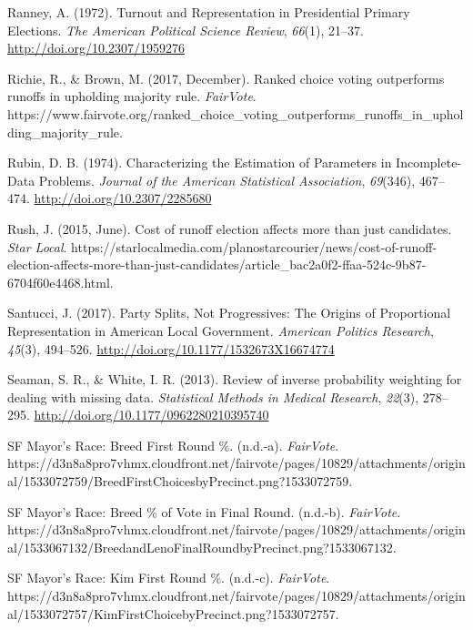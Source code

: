 \documentclass[12pt,twoside]{reedthesis}
\begin{document}
\leavevmode\hypertarget{ref-ranney_turnout_1972}{}%
Ranney, A. (1972). Turnout and Representation in Presidential Primary Elections. \emph{The American Political Science Review}, \emph{66}(1), 21--37. \url{http://doi.org/10.2307/1959276}

\leavevmode\hypertarget{ref-richie_ranked_2017}{}%
Richie, R., \& Brown, M. (2017, December). Ranked choice voting outperforms runoffs in upholding majority rule. \emph{FairVote}. https://www.fairvote.org/ranked\_choice\_voting\_outperforms\_runoffs\_in\_upholding\_majority\_rule.

\leavevmode\hypertarget{ref-rubin_characterizing_1974}{}%
Rubin, D. B. (1974). Characterizing the Estimation of Parameters in Incomplete-Data Problems. \emph{Journal of the American Statistical Association}, \emph{69}(346), 467--474. \url{http://doi.org/10.2307/2285680}

\leavevmode\hypertarget{ref-rush_cost_2015}{}%
Rush, J. (2015, June). Cost of runoff election affects more than just candidates. \emph{Star Local}. https://starlocalmedia.com/planostarcourier/news/cost-of-runoff-election-affects-more-than-just-candidates/article\_bac2a0f2-ffaa-524c-9b87-6704f60e4468.html.

\leavevmode\hypertarget{ref-santucci_party_2017}{}%
Santucci, J. (2017). Party Splits, Not Progressives: The Origins of Proportional Representation in American Local Government. \emph{American Politics Research}, \emph{45}(3), 494--526. \url{http://doi.org/10.1177/1532673X16674774}

\leavevmode\hypertarget{ref-seaman_review_2013}{}%
Seaman, S. R., \& White, I. R. (2013). Review of inverse probability weighting for dealing with missing data. \emph{Statistical Methods in Medical Research}, \emph{22}(3), 278--295. \url{http://doi.org/10.1177/0962280210395740}

\leavevmode\hypertarget{ref-noauthor_sf_nodate-1}{}%
SF Mayor's Race: Breed First Round \%. (n.d.-a). \emph{FairVote}. https://d3n8a8pro7vhmx.cloudfront.net/fairvote/pages/10829/attachments/original/1533072759/BreedFirstChoicesbyPrecinct.png?1533072759.

\leavevmode\hypertarget{ref-noauthor_sf_nodate}{}%
SF Mayor's Race: Breed \% of Vote in Final Round. (n.d.-b). \emph{FairVote}. https://d3n8a8pro7vhmx.cloudfront.net/fairvote/pages/10829/attachments/original/1533067132/BreedandLenoFinalRoundbyPrecinct.png?1533067132.

\leavevmode\hypertarget{ref-noauthor_sf_nodate-3}{}%
SF Mayor's Race: Kim First Round \%. (n.d.-c). \emph{FairVote}. https://d3n8a8pro7vhmx.cloudfront.net/fairvote/pages/10829/attachments/original/1533072757/KimFirstChoicebyPrecinct.png?1533072757.
\end{document}
